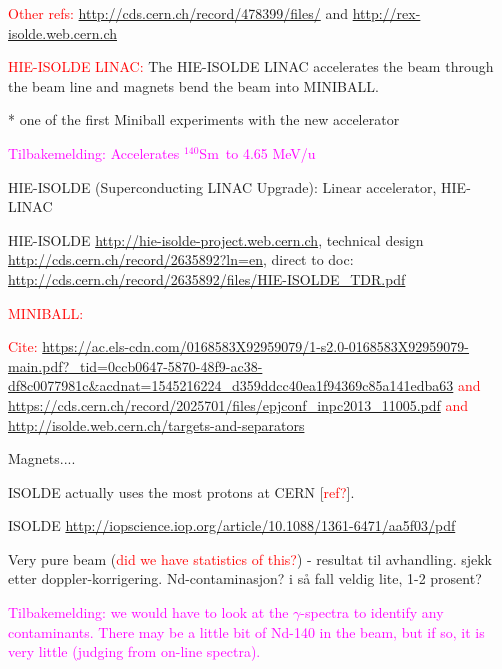 \documentclass[twoside,english]{uiofysmaster/uiofysmaster}
\newcommand{\Sm}{$^{140}$Sm} %
\newcommand{\ga}{$\gamma$}
\begin{document}
\textcolor{red}{Other refs:} \url{http://cds.cern.ch/record/478399/files/} and \url{http://rex-isolde.web.cern.ch}


\textcolor{red}{HIE-ISOLDE LINAC:} \newline
The HIE-ISOLDE LINAC accelerates the beam through the beam line and magnets bend the beam into MINIBALL. 

* one of the first Miniball experiments with the new accelerator

\textcolor{Magenta}{Tilbakemelding: \newline
Accelerates \Sm ~to 4.65 MeV/u}

\bigskip

HIE-ISOLDE (Superconducting LINAC Upgrade): Linear accelerator, HIE-LINAC \newline

\bigskip

HIE-ISOLDE \url{http://hie-isolde-project.web.cern.ch}, technical design \url{http://cds.cern.ch/record/2635892?ln=en}, direct to doc: \url{http://cds.cern.ch/record/2635892/files/HIE-ISOLDE_TDR.pdf}


\textcolor{red}{MINIBALL:} \newline



\textcolor{red}{Cite: \url{https://ac.els-cdn.com/0168583X92959079/1-s2.0-0168583X92959079-main.pdf?_tid=0ccb0647-5870-48f9-ac38-df8c0077981c&acdnat=1545216224_d359ddcc40ea1f94369c85a141edba63} and \url{https://cds.cern.ch/record/2025701/files/epjconf_inpc2013_11005.pdf} and \url{http://isolde.web.cern.ch/targets-and-separators}}


\bigskip

Magnets....

\bigskip

ISOLDE actually uses the most protons at CERN [\textcolor{red}{ref?}].


ISOLDE \url{http://iopscience.iop.org/article/10.1088/1361-6471/aa5f03/pdf}

\bigskip

Very pure beam (\textcolor{red}{did we have statistics of this?}) - resultat til avhandling. sjekk etter doppler-korrigering. Nd-contaminasjon? i så fall veldig lite, 1-2 prosent?

\textcolor{Magenta}{Tilbakemelding: \newline
we would have to look at the \ga-spectra to identify any contaminants. There may be a little bit of Nd-140 in the beam, but if so, it is very little (judging from on-line spectra).}
\end{document}
